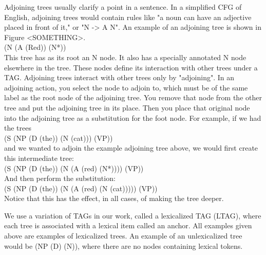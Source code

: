 Adjoining trees usually clarify a point in a sentence.  In a simplified CFG of English, adjoining
trees would contain rules like "a noun can have an adjective placed in front of it," or "N -> A N".
An example of an adjoining tree is shown in Figure <SOMETHING>.\\
(N (A (Red)) (N*))\\
This tree has as its root an N node.  It also has a specially annotated N node elsewhere in the
tree.  These nodes define its interaction with other trees under a TAG.  Adjoining trees interact
with other trees only by "adjoining".  In an adjoining action, you select the node
to adjoin to, which must be of the same label as the root node of the adjoining tree.  You remove
that node from the other tree and put the adjoining tree in its place.  Then
you place that original node into the adjoining tree as a substitution for the foot node.
For example, if we had the trees\\
(S (NP (D (the)) (N (cat))) (VP))\\
and we wanted to adjoin the example adjoining tree above, we would first create this intermediate tree:\\
(S (NP (D (the)) (N (A (red) (N*)))) (VP))\\
And then perform the substitution:\\
(S (NP (D (the)) (N (A (red) (N (cat))))) (VP))\\
Notice that this has the effect, in all cases, of making the tree deeper.

We use a variation of TAGs in our work, called a lexicalized TAG (LTAG), where each tree is
associated with a lexical item called an anchor.  All examples given above are examples of
lexicalized trees.  An example of an unlexicalized tree would be (NP (D) (N)), where there
are no nodes containing lexical tokens.
